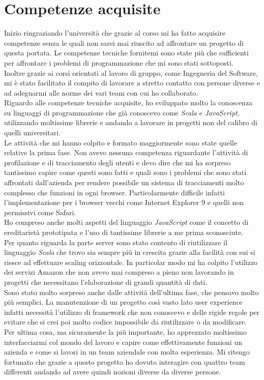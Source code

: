 \documentclass[a4paper, 12pt, twoside, openright]{book}
\begin{document}
\section{Competenze acquisite}
Inizio ringraziando l'università che grazie al corso mi ha fatto acquisire competenze senza le quali non sarei mai riuscito ad affrontare un progetto di questa portata. Le competenze tecniche fornitemi sono state più che sufficienti per affrontare i problemi di programmazione che mi sono stati sottoposti.\\
Inoltre grazie ai corsi orientati al lavoro di gruppo, come Ingegneria del Software, mi è stato facilitato il compito di lavorare a stretto contatto con persone diverse e ad adeguarmi alle norme dei vari team con cui ho collaborato.\\

Riguardo alle competenze tecniche acquisite, ho sviluppato molto la conoscenza su linguaggi di programmazione che già conoscevo come \textit{Scala} e \textit{JavaScript}, utilizzando moltissime librerie e andando a lavorare in progetti non del calibro di quelli universitari.\\
Le attività che mi hanno colpito e formato maggiormente sono state quelle relative la prima fase. Non avevo nessuna competenza riguardante l'attività di profilazione e di tracciamento degli utenti e devo dire che mi ha sorpreso tantissimo capire come questi sono fatti e quali sono i problemi che sono stati affrontati dall'azienda per rendere possibile un sistema di tracciamenti molto complesso che funzioni in ogni browser. Particolarmente difficile infatti l'implementazione per i browser vecchi come Internet Explorer 9 e quelli non permissivi come Safari.\\
Ho compreso anche molti aspetti del linguaggio \textit{JavaScript} come il concetto di ereditarietà prototipata e l'uso di tantissime librerie a me prima sconosciute.\\
Per quanto riguarda la parte server sono stato contento di riutilizzare il linguaggio \textit{Scala} che trovo sia sempre più in crescita grazie alla facilità con sui si riesce ad effettuare scaling orizzontale. In particolar modo mi ha colpito l'utilizzo dei servizi Amazon che non avevo mai compreso a pieno non lavorando in progetti che necessitano l'elaborazione di grandi quantità di dati.\\
Sono stato molto sorpreso anche dalle attività dell'ultima fase, che pensavo molto più semplici. La manutenzione di un progetto così vasto lato user experience infatti necessità l'utilizzo di framework che non conoscevo e delle rigide regole per evitare che si crei poi molto codice impossibile da riutilizzare o da modificare.\\
Per ultima cosa, ma sicuramente la più importante, ho apprezzato moltissimo interfacciarmi col mondo del lavoro e capire come effettivamente funzioni un azienda e come si lavori in un team aziendale con molta esperienza. Mi ritengo fortunato che grazie a questo progetto ho dovuto interagire con quattro team differenti andando ad avere quindi nozioni diverse da diverse persone.\\
\end{document}
